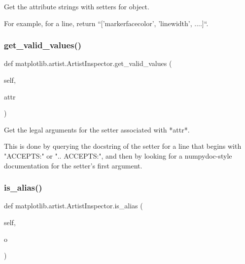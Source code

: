 \begin{DoxyVerb}Get the attribute strings with setters for object.

For example, for a line, return ``['markerfacecolor', 'linewidth',
....]``.
\end{DoxyVerb}
 \mbox{\label{classmatplotlib_1_1artist_1_1ArtistInspector_a1c27c04716e40612bbcb4e6287c7d118}} 
\subsubsection{\texorpdfstring{get\+\_\+valid\+\_\+values()}{get\_valid\_values()}}
{\footnotesize\ttfamily def matplotlib.\+artist.\+Artist\+Inspector.\+get\+\_\+valid\+\_\+values (\begin{DoxyParamCaption}\item[{}]{self,  }\item[{}]{attr }\end{DoxyParamCaption})}

\begin{DoxyVerb}Get the legal arguments for the setter associated with *attr*.

This is done by querying the docstring of the setter for a line that
begins with "ACCEPTS:" or ".. ACCEPTS:", and then by looking for a
numpydoc-style documentation for the setter's first argument.
\end{DoxyVerb}
 \mbox{\label{classmatplotlib_1_1artist_1_1ArtistInspector_a7ca4fefd048b631d03f4f346f2b4becd}} 
\subsubsection{\texorpdfstring{is\+\_\+alias()}{is\_alias()}}
{\footnotesize\ttfamily def matplotlib.\+artist.\+Artist\+Inspector.\+is\+\_\+alias (\begin{DoxyParamCaption}\item[{}]{self,  }\item[{}]{o }\end{DoxyParamCaption})}


